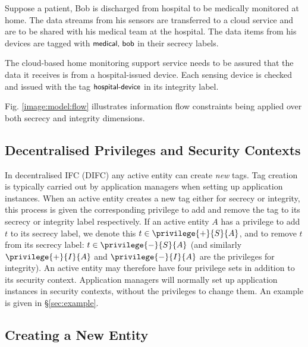 \documentclass[10pt,journal,compsoc]{IEEEtran}
\begin{document}
Suppose a patient, Bob is discharged from hospital to be medically monitored  at home. The data streams from his sensors are transferred to a cloud service and are to be shared with his medical team at the hospital. The data items from his devices are tagged with $\textsf{\small medical, bob}$ in their secrecy labels.


The cloud-based home monitoring support service needs to be assured that the data it receives is 
from a hospital-issued device. 
Each sensing device is checked and issued with the tag $\textsf{\small hospital-device}$ in its integrity label.

Fig. \ref{image:model:flow} illustrates information flow constraints being applied over both secrecy and integrity dimensions.



\subsection{Decentralised Privileges and Security Contexts}
\label{sec:ifc:privileges}


In decentralised IFC (DIFC) any active entity can create \emph{new} tags. Tag creation is typically carried out by application managers when setting up application instances.
When an active entity creates a new tag either for secrecy or integrity, this process is given the corresponding privilege to add and remove the tag to its secrecy or integrity label respectively. If an active entity $A$ has a privilege to add $t$ to its secrecy label, we denote this $t \in \privilege{+}{S}{A}$, and to remove $t$ from its secrecy label: $t \in \privilege{-}{S}{A}$ (and similarly $\privilege{+}{I}{A}$ and $\privilege{-}{I}{A}$ are the privileges for integrity). 
An active entity may therefore have four privilege sets in addition to its security context.
Application managers will normally set up application instances in security contexts, without the privileges to change them. An example is given in \S\ref{sec:example}.


\subsection{Creating a New Entity}
\label{sec:ifc:create}
\end{document}
